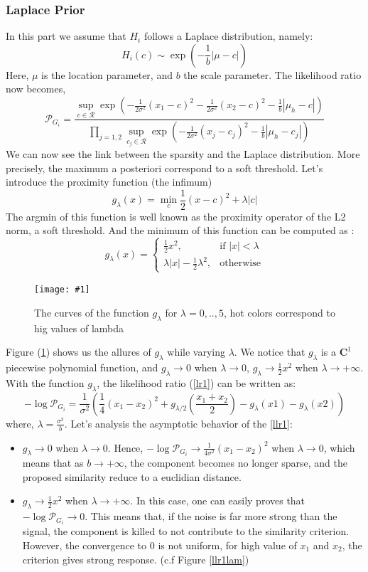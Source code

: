 \documentclass[runningheads]{llncs}
\newcommand{\insertF}[4]{
  \begin{figure}[h!]
    \centering
    \begin{minipage}{#3\linewidth}
    \texttt{[image: \#1]}
    \end{minipage}  
      \caption{#2}
      \label{#4}
  \end{figure}  
}
\newcommand{\wdist}[3]{\frac{1}{2#3}(#1-#2 )^2}
\newcommand{\piecewise}[4]{
\begin{cases}
#1, & #2 \\
#3, & #4
\end{cases}
}
\newcommand{\abs}[1]{|#1|}
\newcommand{\gl}{g_\lambda}
\begin{document}
\subsubsection{Laplace Prior}
In this part we assume that $H_i$ follows a Laplace distribution, namely:
\begin{equation}
 H_i(c) \sim \exp(-\frac{1}{b}|\mu-c|)
\end{equation}
Here, $\mu$ is the location parameter, and $b$ the scale parameter. The likelihood ratio now becomes,
\begin{equation}
 \mathcal{P}_{G_i} = \frac{\sup_{c\in \mathcal{R}} \exp(-\wdist{x_1}{c}{\sigma^2}-\wdist{x_2}{c}{\sigma^2}-\frac{1}{b}|\mu_h-c|) }
{\prod_{j=1,2}\sup_{c_j\in \mathcal{R}} \exp(-\frac{1}{2\sigma^2}(x_j-c_j )^2-\frac{1}{b}|\mu_h-c_j|)  }
\label{lr1}
\end{equation}
We can now see the link between the sparsity and the Laplace distribution. More precisely, the maximum a posteriori correspond to a soft threshold. Let's introduce the proximity function (the infimum)
\[
g_\lambda(x)=\min_c\frac{1}{2}(x-c)^2+\lambda |c|
\]
The argmin of this function is well known as the proximity operator of the L2 norm, a soft threshold. And the minimum of this function can be computed as :
\[
g_\lambda(x)=\piecewise{\frac{1}{2}x^2}{\text{if } \abs{x}<\lambda }{\lambda \abs{x} - \frac{1}{2}\lambda^2}{\text{otherwise}}
\]
\insertF{glambda}{The curves of the function $\gl$ for $\lambda=0,..,5$, hot colors correspond to hig values of lambda}{0.8}{gl}
Figure (\ref{gl}) shows us the allures of $\gl$ while varying $\lambda$. We notice that $\gl$ is a $\mathbf{C}^1$ piecewise polynomial function, and $\gl \rightarrow 0 $ when $\lambda \rightarrow 0$, $\gl \rightarrow \frac{1}{2} x^2 $ when $\lambda \rightarrow +\infty$.  \\
With the function $\gl$, the likelihood ratio (\ref{lr1}) can be written as:
\begin{equation}
  -\log \mathcal{P}_{G_i}=\frac{1}{\sigma^2}(\frac{1}{4}(x_1-x_2)^2 + g_{\lambda/2}(\frac{x_1+x_2}{2})-\gl(x1)-\gl(x2))
  \label{llr1}
\end{equation}
where, $\lambda=\frac{\sigma^2}{b}$. Let's analysis the asymptotic behavior of the \ref{llr1}:
\begin{itemize}
 \item $\gl \rightarrow 0 $ when $\lambda \rightarrow 0$. Hence, $-\log \mathcal{P}_{G_i} \rightarrow \frac{1}{4\sigma^2}(x_1-x_2)^2 $ when $\lambda \rightarrow 0$, which means that as $b \rightarrow +\infty$, the component becomes no longer sparse, and the proposed similarity reduce to a euclidian distance.
 \item $\gl \rightarrow \frac{1}{2} x^2 $ when $\lambda \rightarrow +\infty$. In this case, one can easily proves that $-\log \mathcal{P}_{G_i} \rightarrow 0$. This means that, if the noise is far more strong than the signal, the component is killed to not contribute to the similarity criterion. However, the convergence to $0$ is not uniform, for high value of $x_1$ and $x_2$, the criterion gives strong response. (c.f Figure \ref{llr1lam})
\end{itemize}
\end{document}
